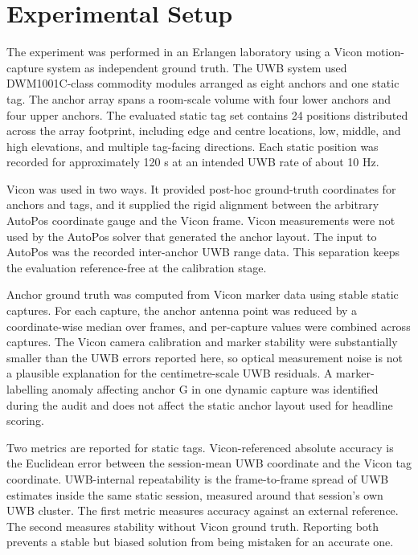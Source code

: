 \documentclass[journal,twoside,web]{ieeecolor}
\begin{document}
\section{Experimental Setup}
\label{sec:experiment}

The experiment was performed in an Erlangen laboratory using a Vicon motion-capture system as independent ground truth. The UWB system used DWM1001C-class commodity modules arranged as eight anchors and one static tag. The anchor array spans a room-scale volume with four lower anchors and four upper anchors. The evaluated static tag set contains 24 positions distributed across the array footprint, including edge and centre locations, low, middle, and high elevations, and multiple tag-facing directions. Each static position was recorded for approximately 120 s at an intended UWB rate of about 10 Hz.

Vicon was used in two ways. It provided post-hoc ground-truth coordinates for anchors and tags, and it supplied the rigid alignment between the arbitrary AutoPos coordinate gauge and the Vicon frame. Vicon measurements were not used by the AutoPos solver that generated the anchor layout. The input to AutoPos was the recorded inter-anchor UWB range data. This separation keeps the evaluation reference-free at the calibration stage.

Anchor ground truth was computed from Vicon marker data using stable static captures. For each capture, the anchor antenna point was reduced by a coordinate-wise median over frames, and per-capture values were combined across captures. The Vicon camera calibration and marker stability were substantially smaller than the UWB errors reported here, so optical measurement noise is not a plausible explanation for the centimetre-scale UWB residuals. A marker-labelling anomaly affecting anchor G in one dynamic capture was identified during the audit and does not affect the static anchor layout used for headline scoring.

Two metrics are reported for static tags. Vicon-referenced absolute accuracy is the Euclidean error between the session-mean UWB coordinate and the Vicon tag coordinate. UWB-internal repeatability is the frame-to-frame spread of UWB estimates inside the same static session, measured around that session's own UWB cluster. The first metric measures accuracy against an external reference. The second measures stability without Vicon ground truth. Reporting both prevents a stable but biased solution from being mistaken for an accurate one.
\end{document}

